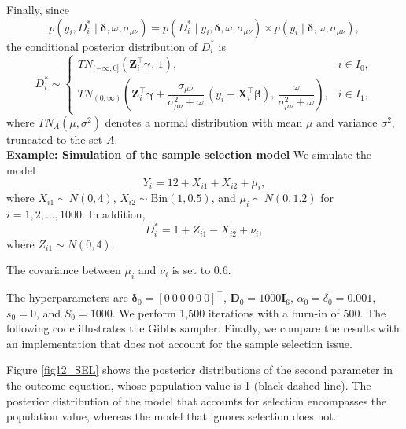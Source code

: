 Finally, since
\[
p(y_i,D_i^*\mid \boldsymbol{\delta},\omega,\sigma_{\mu\nu})
= p(D_i^*\mid y_i, \boldsymbol{\delta},\omega,\sigma_{\mu\nu})
\times p(y_i\mid \boldsymbol{\delta},\omega,\sigma_{\mu\nu}),
\]
the conditional posterior distribution of $D_i^*$ is
\[
D_i^* \sim 
\begin{cases}
	TN_{(-\infty,0]}(\mathbf{Z}_i^{\top}\boldsymbol{\gamma},\,1), & i\in I_0,\\[6pt]
	TN_{(0,\infty)}\!\left(\mathbf{Z}_i^{\top}\boldsymbol{\gamma}
	+\dfrac{\sigma_{\mu\nu}}{\sigma_{\mu\nu}^2+\omega}\,(y_i-\mathbf{X}_i^{\top}\boldsymbol{\beta}),\,
	\dfrac{\omega}{\sigma_{\mu\nu}^2+\omega}\right), & i\in I_1,
\end{cases}
\]
where $TN_{A}(\mu,\sigma^2)$ denotes a normal distribution with mean $\mu$ and variance $\sigma^2$, truncated to the set $A$.\\

\textbf{Example: Simulation of the sample selection model}
We simulate the model 
\[
Y_i = 12 + X_{i1} + X_{i2} + \mu_i,
\]
where $X_{i1}\sim N(0,4)$, $X_{i2}\sim \text{Bin}(1,0.5)$, and $\mu_i\sim N(0,1.2)$ for $i=1,2,\dots,1000$.  
In addition, 
\[
D_i^* = 1 + Z_{i1} - X_{i2} + \nu_i,
\]
where $Z_{i1}\sim N(0,4)$.

The covariance between $\mu_i$ and $\nu_i$ is set to $0.6$.

The hyperparameters are $\boldsymbol{\delta}_0=[0 \ 0 \ 0 \ 0 \ 0 \ 0]^{\top}$, $\mathbf{D}_0=1000\mathbf{I}_6$, $\alpha_0=\delta_0=0.001$, $s_0=0$, and $S_0=1000$. We perform 1,500 iterations with a burn-in of 500. The following code illustrates the Gibbs sampler. Finally, we compare the results with an implementation that does not account for the sample selection issue.

Figure \ref{fig12_SEL} shows the posterior distributions of the second parameter in the outcome equation, whose population value is 1 (black dashed line). The posterior distribution of the model that accounts for selection encompasses the population value, whereas the model that ignores selection does not.

